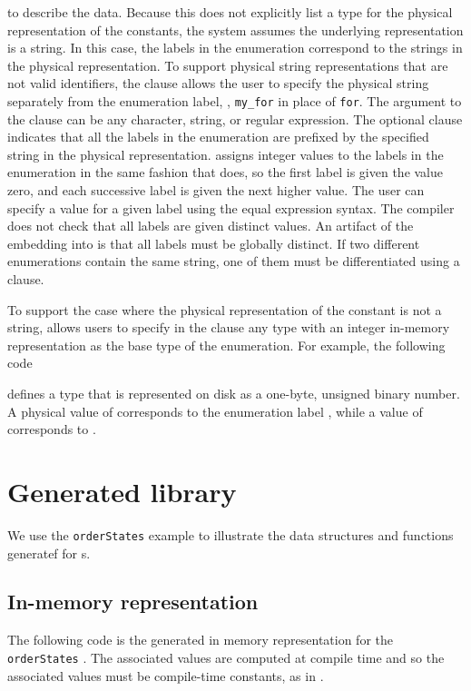 %
\noindent
to describe the data. Because this \penum{} does not explicitly list a
\pads{} type for the physical representation of the constants, the
system assumes the underlying representation is a string.  In this case,
the labels in the enumeration correspond to the strings in the
physical representation.  To support physical string representations that are
not valid \C{} identifiers, the \Pfrom{} clause allows the user to
specify the physical string separately from the enumeration label,
\eg{}, \texttt{my\_for} in place of \texttt{for}.  The argument 
to the \Pfrom{} clause can be any character, string, or regular expression.
The optional \Pprefix{} clause indicates that all the
labels in the enumeration are prefixed by the specified string in the
physical representation.  \pads{} assigns integer values to the labels
in the enumeration in the same fashion that \C{} does, so the first
label is given the value zero, and each successive label is given the
next higher value.  The user can specify a value for a given label
using the equal expression syntax.  The compiler does not check that
all labels are given distinct values. An artifact of the embedding
into \C{} is that all labels must be globally distinct.  If two
different enumerations contain the same string, one of them must be
differentiated using a \Pfrom{} clause.

To support the case where the physical representation of the constant
is not a string, \pads{} allows users to specify in the 
 clause any \pads{} type with an integer
in-memory representation as the base type of the enumeration.  For
example, the following code

%
\noindent
defines a type  that is represented on disk as a one-byte,
unsigned binary number.  A physical value of  corresponds to the
enumeration label , while a value of  corresponds to
. 

\section{Generated library}
We use the \texttt{orderStates} example to illustrate the data
structures and functions generatef for \Penum{}s.
\subsection{In-memory representation}
\label{sec:enums-rep}
The following \C{} code is the generated in memory representation for
the \texttt{orderStates} \Penum{}. The associated values are computed
at \pads{} compile time and so the associated values must be
compile-time constants, as in \C{}.

